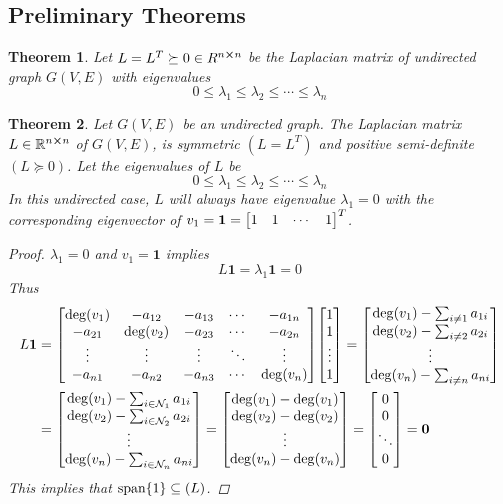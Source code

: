 \documentclass[]{article}
\numberwithin{equation}{section}
\newcommand{\R}{\mathbb{R}}
\newtheorem{theorem}{Theorem}
\begin{document}
\subsection{Preliminary Theorems}
\begin{theorem}
	Let $L = L^T \succeq 0 \in R^{n\cross n}$ be the Laplacian matrix of undirected graph $G(V,E)$ with eigenvalues \[
		0 \leq \lambda_1 \leq \lambda_2 \leq \cdots \leq \lambda_n
	\]
\end{theorem}

\begin{theorem}\label{thm:L_eig_1_eq_zero}
	Let $G(V,E)$ be an undirected graph.
	The Laplacian matrix $L\in\R^{n \cross n}$ of $G(V,E)$, is symmetric $(L=L^T)$ and positive semi-definite $(L\succeq 0)$.
	Let the eigenvalues of $L$ be\[
		0 \leq \lambda_1 \leq \lambda_2 \leq \cdots \leq \lambda_n
	\] In this undirected case, $L$ will always have eigenvalue $\lambda_1 = 0$ with the corresponding eigenvector of $v_1 = \mathbf{1} = \mqty[1 &1 &\cdots &1]^T$.
	\begin{proof}
		$\lambda_1 = 0$ and $v_1 = \mathbf{1}$ implies\[
			L \mathbf{1} = \lambda_1 \mathbf{1} = 0
		\]Thus
		\begin{align*}
			L \mathbf{1} 
				&= \mqty[
					\deg(v_1)	&-a_{12}	&-a_{13}	&\cdots	&-a_{1n}\\
					-a_{21}		&\deg(v_2)	&-a_{23}	&\cdots	&-a_{2n}\\
					\vdots		&\vdots		&\vdots		&\ddots	&\vdots\\
					-a_{n1}		&-a_{n2}	&-a_{n3}	&\cdots	&\deg(v_n)
				] \mqty[
					1  \\1	\\\vdots	\\1
				] = \mqty[
					\deg(v_1) - \sum_{i\neq 1} a_{1i}\\
					\deg(v_2) - \sum_{i\neq 2} a_{2i}\\
					\vdots\\
					\deg(v_n) - \sum_{i\neq n} a_{ni}\\
				]\\
				&= \mqty[
					\deg(v_1) - \sum_{i\in\mathcal{N}_1} a_{1i}\\
					\deg(v_2) - \sum_{i\in\mathcal{N}_2} a_{2i}\\
					\vdots\\
					\deg(v_n) - \sum_{i\in\mathcal{N}_n} a_{ni}\\
				] = \mqty[
					\deg(v_1) - \deg(v_1)\\
					\deg(v_2) - \deg(v_2)\\
					\vdots\\
					\deg(v_n) - \deg(v_n)\\
				] = \mqty[
					0\\	0\\	\ddots\\ 0
				] = \mathbf{0}
		\end{align*}
		This implies that $\text{span}\qty{1} \subseteq \null(L)$.
	\end{proof}
\end{theorem}
\end{document}
